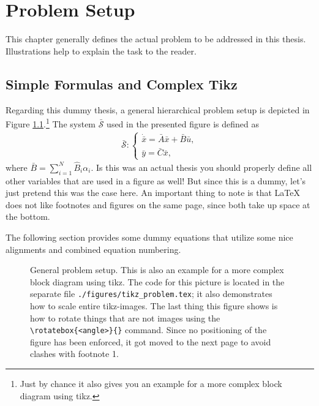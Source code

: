 \chapter{Problem Setup}
\thispagestyle{empty}
This chapter generally defines the actual problem to be addressed in this thesis. Illustrations help to explain the task to the reader.

\section{Simple Formulas and Complex Tikz}
Regarding this dummy thesis, a general hierarchical problem setup is depicted in Figure \ref{fig:problem}.\footnote{Just by chance it also gives you an example for a more complex block diagram using tikz.} The system $\bar{\mathcal{S}}$ used in the presented figure is defined as
\begin{align*}
\bar{\mathcal{S}}:
\begin{cases}
\dot{\bar{x}}=\bar{A}\bar{x}+\bar{B}\bar{u},\\
\bar{y}=\bar{C}\bar{x},
\end{cases}
\end{align*}
where $\bar{B}=\sum_{i=1}^{N}\hat{B}_{i}\alpha_{i}$. Is this was an actual thesis you should properly define all other variables that are used in a figure as well! But since this is a dummy, let's just pretend this was the case here. An important thing to note is that \LaTeX\; does not like footnotes and figures on the same page, since both take up space at the bottom.

The following section provides some dummy equations that utilize some nice alignments and combined equation numbering.

\begin{figure}
\centering
{}
\caption[Complex block diagrams in tikz]{General problem setup. This is also an example for a more complex block diagram using tikz. The code for this picture is located in the separate file \texttt{./figures/tikz\_problem.tex}; it also demonstrates how to scale entire tikz-images. The last thing this figure shows is how to rotate things that are not images using the \texttt{\textbackslash rotatebox\{<angle>\}\{<stuff to rotate>\}} command. Since no positioning of the figure has been enforced, it got moved to the next page to avoid clashes with footnote 1.}
\label{fig:problem}
\end{figure}

